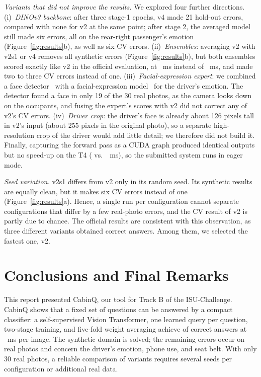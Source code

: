 \documentclass[10pt,conference]{IEEEtran}
\newcommand{\tool}{CabinQ}%
\begin{document}
\emph{Variants that did not improve the results.} We explored four further directions. (i)~\emph{DINOv3 backbone}: after three stage-1 epochs, v4 made 21 hold-out errors, compared with none for v2 at the same point; after stage 2, the averaged model still made six errors, all on the rear-right passenger's emotion (Figure~\ref{fig:results}b), as well as six CV errors. (ii)~\emph{Ensembles}: averaging v2 with v2s1 or v4 removes all synthetic errors (Figure~\ref{fig:results}b), but both ensembles scored exactly like v2 in the official evaluation, at \ensLat{}~ms instead of \vTwoLat{}~ms, and made two to three CV errors instead of one. (iii)~\emph{Facial-expression expert}: we combined a face detector~\cite{wu2023yunet} with a facial-expression model~\cite{savchenko2022classifying} for the driver's emotion. The detector found a face in only 19 of the 30 real photos, as the camera looks down on the occupants, and fusing the expert's scores with v2 did not correct any of v2's CV errors. (iv)~\emph{Driver crop}: the driver's face is already about 126 pixels tall in v2's input (about 255 pixels in the original photo), so a separate high-resolution crop of the driver would add little detail; we therefore did not build it. Finally, capturing the forward pass as a CUDA graph produced identical outputs but no speed-up on the T4 (\graphGraph{} vs.\ \graphEager{}~ms), so the submitted system runs in eager mode.

\emph{Seed variation.} v2s1 differs from v2 only in its random seed. Its synthetic results are equally clean, but it makes six CV errors instead of one (Figure~\ref{fig:results}a). Hence, a single run per configuration cannot separate configurations that differ by a few real-photo errors, and the CV result of v2 is partly due to chance. The official results are consistent with this observation, as three different variants obtained \vTwoCorrect{} correct answers. Among them, we selected the fastest one, v2.

\section{Conclusions and Final Remarks}\label{sec:conclusions}
This report presented \tool{}, our tool for Track B of the ISU-Challenge. \tool{} shows that a fixed set of questions can be answered by a compact classifier: a self-supervised Vision Transformer, one learned query per question, two-stage training, and five-fold weight averaging achieve \vTwoCorrect{} of \nAll{} correct answers at \vTwoLat{}~ms per image. The synthetic domain is solved; the remaining errors occur on real photos and concern the driver's emotion, phone use, and seat belt. With only 30 real photos, a reliable comparison of variants requires several seeds per configuration or additional real data.
\end{document}
